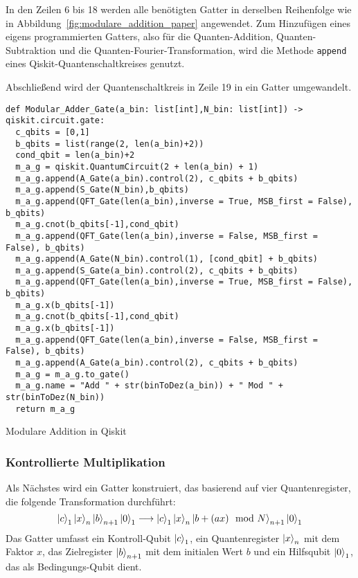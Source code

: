 In den Zeilen 6 bis 18 werden alle benötigten Gatter 
in derselben Reihenfolge wie in Abbildung~\ref{fig:modulare_addition_paper} angewendet.
Zum Hinzufügen eines eigens programmierten Gatters, 
also für die Quanten-Addition, Quanten-Subtraktion und die Quanten-Fourier-Transformation,
wird die Methode \texttt{append} eines Qiskit-Quantenschaltkreises genutzt.

Abschließend wird der Quantenschaltkreis in Zeile 19 in ein Gatter umgewandelt.

\begin{listing}[H]
\begin{verbatim}    
def Modular_Adder_Gate(a_bin: list[int],N_bin: list[int]) -> qiskit.circuit.gate:
  c_qbits = [0,1]
  b_qbits = list(range(2, len(a_bin)+2))
  cond_qbit = len(a_bin)+2
  m_a_g = qiskit.QuantumCircuit(2 + len(a_bin) + 1) 
  m_a_g.append(A_Gate(a_bin).control(2), c_qbits + b_qbits)
  m_a_g.append(S_Gate(N_bin),b_qbits)
  m_a_g.append(QFT_Gate(len(a_bin),inverse = True, MSB_first = False), b_qbits)
  m_a_g.cnot(b_qbits[-1],cond_qbit)
  m_a_g.append(QFT_Gate(len(a_bin),inverse = False, MSB_first = False), b_qbits)
  m_a_g.append(A_Gate(N_bin).control(1), [cond_qbit] + b_qbits)
  m_a_g.append(S_Gate(a_bin).control(2), c_qbits + b_qbits)
  m_a_g.append(QFT_Gate(len(a_bin),inverse = True, MSB_first = False), b_qbits)
  m_a_g.x(b_qbits[-1])
  m_a_g.cnot(b_qbits[-1],cond_qbit)
  m_a_g.x(b_qbits[-1])
  m_a_g.append(QFT_Gate(len(a_bin),inverse = False, MSB_first = False), b_qbits)
  m_a_g.append(A_Gate(a_bin).control(2), c_qbits + b_qbits)
  m_a_g = m_a_g.to_gate()
  m_a_g.name = "Add " + str(binToDez(a_bin)) + " Mod " + str(binToDez(N_bin))
  return m_a_g
  \end{verbatim}
  \caption{Modulare Addition in Qiskit}
  \label{code:ModularAddition}
\end{listing}

\subsubsection{Kontrollierte Multiplikation}
Als Nächstes wird ein Gatter konstruiert, 
das basierend auf vier Quantenregister,
die folgende Transformation durchführt: 
\[\ket{c}_1\ket{x}_{n}\ket{b}_{n+1}\ket{0}_1
\longrightarrow
\ket{c}_1\ket{x}_{n}\ket{b + (ax)\mod N}_{n+1}\ket{0}_1\]
Das Gatter umfasst ein Kontroll-Qubit \(\ket{c}_1\), 
ein Quantenregister \(\ket{x}_{n}\) mit dem Faktor \(x\),
das Zielregister \(\ket{b}_{n+1}\) mit dem initialen Wert \(b\) und 
ein Hilfsqubit \(\ket{0}_1\), das als Bedingungs-Qubit dient.

